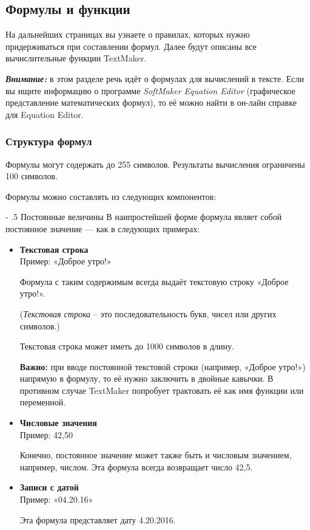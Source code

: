 ﻿\documentclass[a4paper,10pt]{article}
\makeatletter
\renewcommand\paragraph{%
   \@startsection{paragraph}{4}{0mm}%
      {-\baselineskip}%
      {.5\baselineskip}%
      {\normalfont\normalsize\bfseries}}
\makeatother
\begin{document}
\subsection{Формулы и функции}
На дальнейших страницах вы узнаете о правилах, которых нужно придерживаться при составлении формул. Далее будут описаны все вычислительные функции TextMaker.

\begin{mdframed}[backgroundcolor=blue!10]
\textbf{\textit{Внимание:}} в этом разделе речь идёт о формулах для вычислений в тексте. Если вы ищите информацию о программе \textit{SoftMaker Equation Editor} (графическое представление математических формул), то её можно найти в он-лайн справке для Equation Editor.
\end{mdframed}

\subsubsection{Структура формул}
Формулы могут содержать до 255 символов. Результаты вычисления ограничены 100 символов.

Формулы можно составлять из следующих компонентов:

\paragraph{Постоянные величины}
В наипростейшей форме формула являет собой постоянное значение — как в следующих примерах:

\begin{itemize}
 \item \textbf{Текстовая строка}\\
 Пример: «Доброе утро!»
 
 Формула с таким содержимым всегда выдаёт текстовую строку «Доброе утро!».
 
 (\textit{Текстовая строка} -- это последовательность букв, чисел или других символов.)
 
 Текстовая строка может иметь до 1000 символов в длину.
 
 \textbf{Важно:} при вводе постоянной текстовой строки (например, «Доброе утро!») напрямую в формулу, то её нужно заключить в двойные кавычки. В противном случае TextMaker попробует трактовать её как имя функции или переменной.
 \item \textbf{Числовые значения}\\
 Пример: 42,50
 
 Конечно, постоянное значение может также быть и числовым значением, например, числом. Эта формула всегда возвращает число 42,5.
 \item \textbf{Записи с датой}\\
 Пример: «04.20.16»
 
 Эта формула представляет дату 4.20.2016.
\end{itemize}
\end{document}
